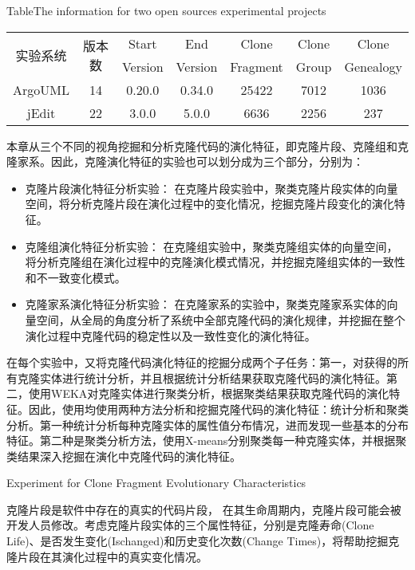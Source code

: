 \begin{table}[htbp]
{Table$\!$}{The information for two open sources experimental projects }
\vspace{0.5em}
\centering 
\wuhao
\begin{tabular}{ccccccc}
\toprule[1.5pt ]
\multirow{2}{*}{实验系统}&\multirow{2}{*}{版本数}&Start&End&Clone&Clone&Clone\\ 
&&Version&Version&Fragment&Group&Genealogy\\
\midrule[1pt]
ArgoUML&14&0.20.0&0.34.0&25422&7012&1036\\ 
jEdit&22&3.0.0&5.0.0&6636&2256	&237\\ 
\bottomrule[1.5pt]
\end{tabular}
\end{table}

本章从三个不同的视角挖掘和分析克隆代码的演化特征，即克隆片段、克隆组和克隆家系。因此，克隆演化特征的实验也可以划分成为三个部分，分别为：
\begin{itemize}
\item 克隆片段演化特征分析实验：
在克隆片段实验中，聚类克隆片段实体的向量空间，将分析克隆片段在演化过程中的变化情况，挖掘克隆片段变化的演化特征。 
\item 克隆组演化特征分析实验：
在克隆组实验中，聚类克隆组实体的向量空间，将分析克隆组在演化过程中的克隆演化模式情况，并挖掘克隆组实体的一致性和不一致变化模式。
\item 克隆家系演化特征分析实验：
在克隆家系的实验中，聚类克隆家系实体的向量空间，从全局的角度分析了系统中全部克隆代码的演化规律，并挖掘在整个演化过程中克隆代码的稳定性以及一致性变化的演化特征。
\end{itemize}

在每个实验中，又将克隆代码演化特征的挖掘分成两个子任务：第一，对获得的所有克隆实体进行统计分析，并且根据统计分析结果获取克隆代码的演化特征。第二，使用WEKA对克隆实体进行聚类分析，根据聚类结果获取克隆代码的演化特征。因此，使用均使用两种方法分析和挖掘克隆代码的演化特征：统计分析和聚类分析。第一种统计分析每种克隆实体的属性值分布情况，进而发现一些基本的分布特征。第二种是聚类分析方法，使用X-means分别聚类每一种克隆实体，并根据聚类结果深入挖掘在演化中克隆代码的演化特征。

{Experiment for Clone Fragment Evolutionary Characteristics}

克隆片段是软件中存在的真实的代码片段， 在其生命周期内，克隆片段可能会被开发人员修改。考虑克隆片段实体的三个属性特征，分别是克隆寿命(Clone Life)、是否发生变化(Ischanged)和历史变化次数(Change Times)，将帮助挖掘克隆片段在其演化过程中的真实变化情况。


